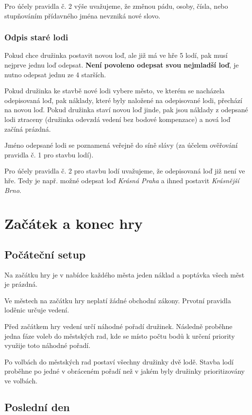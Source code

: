 \documentclass[a4paper, 12pt, twoside]{article}
\begin{document}
Pro účely pravidla č. 2 výše uvažujeme, že změnou pádu, osoby, čísla, nebo stupňováním přídavného jména nevzniká nové slovo.

\subsubsection{Odpis staré lodi}
\label{odpis}

Pokud chce družinka postavit novou loď, ale již má ve hře 5 lodí, pak musí nejprve jednu loď odepsat.  \textbf{Není povoleno odepsat svou nejmladší loď}, 
je nutno odepsat jednu ze 4 starších.

Pokud družinka ke stavbě nové lodi vybere město, ve kterém se nacházela odepisovaná loď, pak náklady, které byly naložené na odepisované lodi, přechází
na novou loď.  Pokud družinka staví novou loď jinde, pak jsou náklady z odepsané lodi ztraceny (družinka odevzdá vedení
bez bodové kompenzace) a nová loď začíná prázdná.

Jméno odepsané lodi se poznamená veřejně do síně slávy (za účelem ověřování pravidla č. 1 pro stavbu lodí).

Pro účely pravidla č. 2 pro stavbu lodí uvažujeme, že odepisovaná loď již není ve hře.  Tedy je např. možné odepsat loď \emph{Krásná Praha} a ihned postavit \emph{Krásnější Brno}.

\section{Začátek a konec hry}

\subsection{Počáteční setup}

Na začátku hry je v nabídce každého města jeden náklad a poptávka všech měst je prázdná.

Ve městech na začátku hry neplatí žádné obchodní zákony.  Prvotní pravidla loděnic určuje vedení.

Před začátkem hry vedení určí náhodné pořadí družinek.  Následně proběhne jedna fáze voleb do městských rad, kde se místo počtu bodů k určení priority využije
toto náhodné pořadí.  

Po volbách do městských rad postaví všechny družinky dvě lodě.  Stavba lodí proběhne po jedné v obráceném pořadí než v jakém byly družinky prioritizovány ve volbách.



\subsection{Poslední den}
\end{document}
